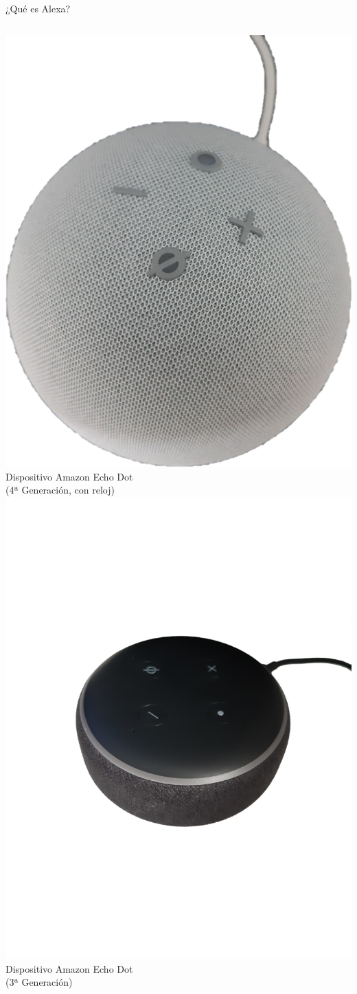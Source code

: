 \documentclass{beamer}
\begin{document}
\begin{frame}{¿Qué es Alexa?}
\begin{columns}[c]
\begin{column}{.49\textwidth}
{          \includegraphics[width=.46\textwidth]{echo-dot-2.png}
          \centering
          {
          \footnotesize
          Dispositivo Amazon Echo Dot\\
          (4ª Generación, con reloj)
          }
        }
        {
          \includegraphics[width=\textwidth,trim={0 45cm 0 40cm},clip]
          {echo-dot-3-gen.png}
          \centering
          {
          \footnotesize
          Dispositivo Amazon Echo Dot\\
          (3ª Generación)
          }
        }
        
      \end{column}
    \end{columns}
  \end{frame}
\end{document}
